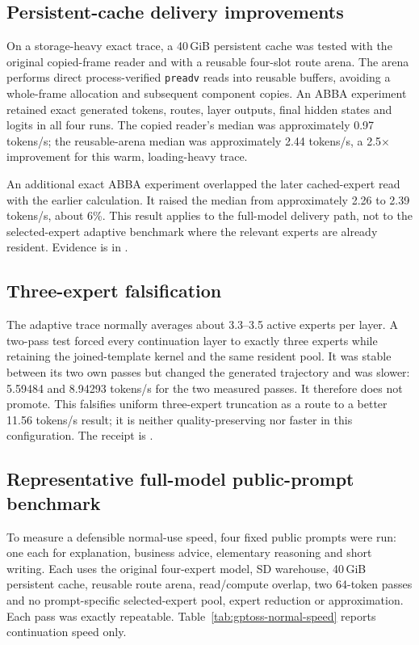 \subsection{Persistent-cache delivery improvements}
On a storage-heavy exact trace, a 40\,GiB persistent cache was tested with
the original copied-frame reader and with a reusable four-slot route arena.
The arena performs direct process-verified \texttt{preadv} reads into reusable
buffers, avoiding a whole-frame allocation and subsequent component copies.
An ABBA experiment retained exact generated tokens, routes, layer outputs,
final hidden states and logits in all four runs. The copied reader's median
was approximately 0.97 tokens/s; the reusable-arena median was approximately
2.44 tokens/s, a 2.5$\times$ improvement for this warm, loading-heavy trace.

An additional exact ABBA experiment overlapped the later cached-expert read
with the earlier calculation. It raised the median from approximately 2.26 to
2.39 tokens/s, about 6\%. This result applies to the full-model delivery path,
not to the selected-expert adaptive benchmark where the relevant experts are
already resident. Evidence is in
.

\subsection{Three-expert falsification}
The adaptive trace normally averages about 3.3--3.5 active experts per layer.
A two-pass test forced every continuation layer to exactly three experts while
retaining the joined-template kernel and the same resident pool. It was stable
between its two own passes but changed the generated trajectory and was slower:
5.59484 and 8.94293 tokens/s for the two measured passes. It therefore does
not promote. This falsifies uniform three-expert truncation as a route to a
better 11.56 tokens/s result; it is neither quality-preserving nor faster in
this configuration. The receipt is
.

\subsection{Representative full-model public-prompt benchmark}
To measure a defensible normal-use speed, four fixed public prompts were run:
one each for explanation, business advice, elementary reasoning and short
writing. Each uses the original four-expert model, SD warehouse, 40\,GiB
persistent cache, reusable route arena, read/compute overlap, two 64-token
passes and no prompt-specific selected-expert pool, expert reduction or
approximation. Each pass was exactly repeatable. Table~\ref{tab:gptoss-normal-speed}
reports continuation speed only.

